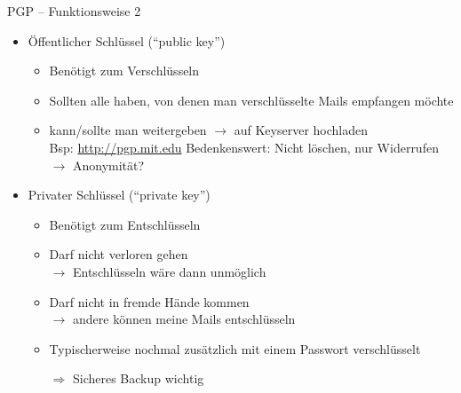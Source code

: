 \documentclass{beamer}
\begin{document}
\begin{frame}[label=bg3]{PGP – Funktionsweise 2}
  
    \begin{itemize}
   \item Öffentlicher Schlüssel ("`public key"')
   \begin{itemize}
    \item Benötigt zum Verschlüsseln
    \item Sollten alle haben, von denen man verschlüsselte Mails empfangen möchte
    \item kann/sollte man weitergeben $\rightarrow$ auf Keyserver hochladen\\
    {\tiny Bsp: \url{http://pgp.mit.edu} \quad Bedenkenswert: Nicht löschen, nur Widerrufen $\rightarrow$ Anonymität?}
    
   \end{itemize}
   \pause
   \item Privater Schlüssel ("`private key"')
   \begin{itemize}
    \item Benötigt zum Entschlüsseln
    \item Darf nicht verloren gehen\\$\rightarrow$ Entschlüsseln wäre dann unmöglich\\[1mm]
    \item Darf nicht in fremde Hände kommen\\ $\rightarrow$ andere können meine Mails entschlüsseln\\[1mm]
    \item Typischerweise nochmal zusätzlich mit einem Passwort verschlüsselt\\[2mm]
    \pause
    \item[$\Rightarrow$] Sicheres Backup wichtig
   \end{itemize}


  \end{itemize}
  
\end{frame}

\end{document}
